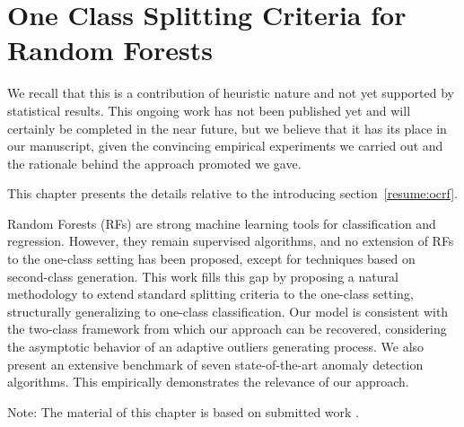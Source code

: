 \chapter{One Class Splitting Criteria for Random Forests}
\label{chap:ocrf}

We recall that this is a contribution of heuristic nature and not yet supported by statistical results. This ongoing work has not been published yet and will certainly be completed in the near future, but we believe that it has its place in our manuscript, given the convincing empirical experiments we carried out and the rationale behind the approach promoted we gave.

\begin{chapabstract}
This chapter presents the details relative to the introducing section~\ref{resume:ocrf}.

Random Forests (RFs) are strong machine learning tools for classification and regression. However, they remain supervised algorithms, and no extension of RFs to the one-class setting has been proposed, except for techniques based on second-class generation.
This work fills this gap by proposing a natural methodology to extend standard splitting criteria to the one-class setting, structurally generalizing to one-class classification.
Our model is consistent with the two-class framework from which our approach can be recovered, considering the asymptotic behavior of an adaptive outliers generating process.
We also present an extensive benchmark of seven state-of-the-art anomaly detection algorithms. This empirically demonstrates the relevance of our approach.
\end{chapabstract}

Note: The material of this chapter is based on submitted work \citep{OCRF16}.


